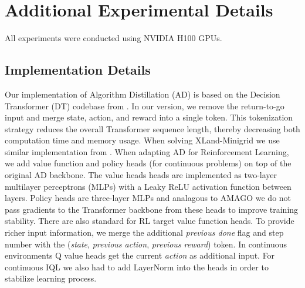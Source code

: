 \documentclass{article}
\begin{document}
\section{Additional Experimental Details}
\label{app:details}
All experiments were conducted using NVIDIA H100 GPUs.
\subsection{Implementation Details}
Our implementation of Algorithm Distillation (AD) is based on the Decision Transformer (DT) codebase from \citet{tarasov2024corl}.  In our version, we remove the return-to-go input and merge state, action, and reward into a single token. This tokenization strategy reduces the overall Transformer sequence length, thereby decreasing both computation time and memory usage. When solving XLand-Minigrid we use similar implementation from \citet{nikulin2024xland}.
When adapting AD for Reinforcement Learning, we add value function and policy heads (for continuous problems) on top of the original AD backbone. The value heads heads are implemented as two-layer multilayer perceptrons (MLPs) with a Leaky ReLU activation function between layers. Policy heads are three-layer MLPs and analagous to AMAGO \citep{grigsby2023amago} we do not pass gradients to the Transformer backbone from these heads to improve training stability. There are also standard for RL target value function heads. To provide richer input information, we merge the additional \textit{previous done} flag and step number with the (\textit{state}, \textit{previous action}, \textit{previous reward}) token. In continuous environments Q value heads get the current \textit{action} as additional input. For continuous IQL we also had to add LayerNorm \citep{ba2016layer} into the heads in order to stabilize learning process.
\end{document}
